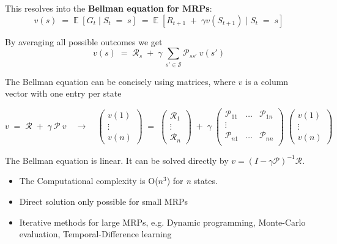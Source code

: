 \documentclass[10pt]{article}
\begin{document}
This resolves into the \textbf{Bellman equation for MRPs}:
\begin{equation}
v(s) \; = \; \mathbb{E}\;[G_{t} \; | \; S_{t} \; = \; s] \; = \; \mathbb{E}\;[R_{t+1} \; + \; \gamma v(S_{t+1}) \; | \; S_{t} \; = \; s]
\end{equation}

By averaging all possible outcomes we get
\begin{equation}
v(s) \; = \; \mathcal{R}_{s} \; + \; \gamma \: \sum_{s' \in \mathcal{S}} \mathcal{P}_{ss'}\:v(s')
 \label{eq:averaging_mrp}
\end{equation}

The Bellman  equation can be concisely using matrices, where $v$ is a column vector with one entry per state

\begin{equation}
v \; = \; \mathcal{R} \; + \; \gamma \: \mathcal{P} \: v \quad \rightarrow \quad
\begin{pmatrix}
v(1) \\ \vdots \\ v(n) \end{pmatrix} \; = \; \begin{pmatrix}
\mathcal{R}_{1} \\ \vdots \\ \mathcal{R}_{n} \end{pmatrix} \; + \; \gamma \; \begin{pmatrix}
\mathcal{P}_{11} & \ldots & \mathcal{P}_{1n} \\
\vdots & & \\
\mathcal{P}_{n1} & \ldots & \mathcal{P}_{nn} \\ \end{pmatrix} \; \begin{pmatrix}
v(1) \\ \vdots \\ v(n) \end{pmatrix} \label{eq:mrp_matrix}
\end{equation} 

The Bellman equation is linear. It can be solved directly by $v = (I - \gamma \mathcal{P})^{-1} \mathcal{R}$.

\begin{itemize}
\item The Computational complexity is O($n^{3}$) for \textit{n} states.
\item Direct solution only possible for small MRPs
\item Iterative methods for large MRPs, e.g. Dynamic programming, Monte-Carlo evaluation, Temporal-Difference learning
\end{itemize}
\end{document}
